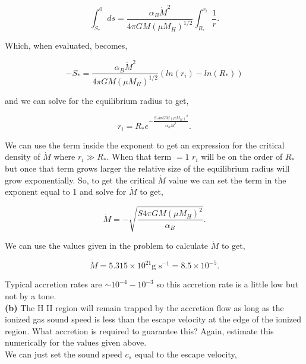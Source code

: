 \documentclass[12pt]{article}
\begin{document}
\begin{equation}
\int_{S_*}^0 ds = \frac{\alpha_B \dot{M}^2}{4\pi GM \left( \mu M_H \right)^{1/2}} \int_{R_*}^{r_i} \frac{1}{r}.
\end{equation}

\noindent Which, when evaluated, becomes,

\begin{equation}
-S_* = \frac{\alpha_B \dot{M}^2}{4\pi GM \left( \mu M_H \right)^{1/2}} \left( ln\left(r_i\right) - ln\left(R_* \right)\right)
\end{equation}

\noindent and we can solve for the equilibrium radius to get,

\begin{equation}
r_i = R_* e^{ - \frac{S_* 4 \pi G M \left( \mu M_H\right)^2 }{\alpha_B \dot{M}^2} }.
\end{equation}

\noindent We can use the term inside the exponent to get an expression for the critical density of $\dot{M}$ where $r_i \gg R_*$. When that term $ = 1$ $r_i$ will be on the order of $R_*$ but once that term grows larger the relative size of the equilibrium radius will grow exponentially. So, to get the critical $\dot{M}$ value we can set the term in the exponent equal to 1 and solve for $\dot{M}$ to get,

\begin{equation}
\dot{M} = - \sqrt{ \frac{S 4 \pi GM \left( \mu M_H \right)^2}{\alpha_B}}.
\end{equation} 

\noindent We can use the values given in the problem to calculate $\dot{M}$ to get, 

\begin{equation}
\dot{M} = 5.315 \times 10^{21} \text{g } \text{s}^{-1} = 8.5 \times 10^{-5}.
\end{equation}

\noindent Typical accretion rates are $\sim 10^{-4} - 10^{-3}$ so this accretion rate is a little low but not by a tone. \\

\noindent \textbf{(b)} The H II region will remain trapped by the accretion flow as long as the ionized gas sound speed is less than the escape velocity at the edge of the ionized region. What accretion is required to guarantee this? Again, estimate this numerically for the values given above. \\

\noindent We can just set the sound speed $c_s$ equal to the escape velocity,
\end{document}
